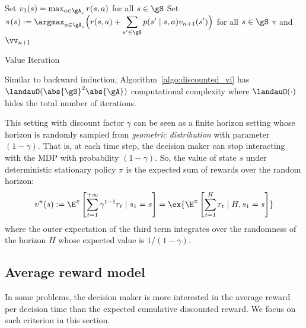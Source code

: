 \begin{algorithm}[ht]
    \DontPrintSemicolon
    \Input{a MDP $M=\langle\gS,\gA,r,p\rangle$, discount factor $\gamma\in[0,1)$, and accuracy $\varepsilon\in(0,1)$}
    \BlankLine
    Set $v_1(s)=\max_{a\in\gA_s} r(s,a)$ for all $s\in\gS$ \;
    Set $\pi(s):=\displaystyle\argmax_{a\in\gA_s}\Big(r(s,a)+\sum_{s'\in\gS}p(s'\mid s,a)v_{n+1}(s')\Big)$ for all $s\in\gS$ \;
    \Return $\pi$ and $\vv_{n+1}$
    \caption{Value Iteration}
    \label{algo:discounted_vi}
\end{algorithm}

Similar to backward induction, Algorithm~\ref{algo:discounted_vi} has $\landauO(\abs{\gS}^2\abs{\gA})$ computational complexity where $\landauO(\cdot)$ hides the total number of iterations.

This setting with discount factor $\gamma$ can be seen as a finite horizon setting whose horizon is randomly sampled from \emph{geometric distribution} with parameter $(1-\gamma)$.
That is, at each time step, the decision maker can stop interacting with the MDP with probability $(1-\gamma)$.
So, the value of state $s$ under deterministic stationary policy $\pi$ is the expected sum of rewards over the random horizon:
\begin{equation}
    \label{eq:discount_finite}
    v^\pi(s) :=\E^\pi\left[\sum_{t=1}^{+\infty} \gamma^{t-1}r_t \mid s_1=s\right] =\ex{\E^\pi\left[\sum_{t=1}^H r_t\mid H, s_1=s\right]}
\end{equation}
where the outer expectation of the third term integrates over the randomness of the horizon $H$ whose expected value is $1/(1-\gamma)$.

\subsection{Average reward model}

In some problems, the decision maker is more interested in the average reward per decision time than the expected cumulative discounted reward.
We focus on such criterion in this section.


